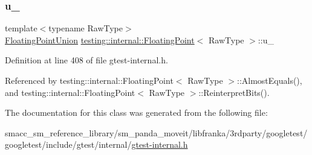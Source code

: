 \subsubsection{\texorpdfstring{u\+\_\+}{u\_}}
{\footnotesize\ttfamily template$<$typename Raw\+Type$>$ \\
\hyperlink{uniontesting_1_1internal_1_1FloatingPoint_1_1FloatingPointUnion}{Floating\+Point\+Union} \hyperlink{classtesting_1_1internal_1_1FloatingPoint}{testing\+::internal\+::\+Floating\+Point}$<$ Raw\+Type $>$\+::u\+\_\+\hspace{0.3cm}{\ttfamily [private]}}



Definition at line 408 of file gtest-\/internal.\+h.



Referenced by testing\+::internal\+::\+Floating\+Point$<$ Raw\+Type $>$\+::\+Almost\+Equals(), and testing\+::internal\+::\+Floating\+Point$<$ Raw\+Type $>$\+::\+Reinterpret\+Bits().



The documentation for this class was generated from the following file\+:\begin{DoxyCompactItemize}
\item 
smacc\+\_\+sm\+\_\+reference\+\_\+library/sm\+\_\+panda\+\_\+moveit/libfranka/3rdparty/googletest/googletest/include/gtest/internal/\hyperlink{gtest-internal_8h}{gtest-\/internal.\+h}\end{DoxyCompactItemize}
